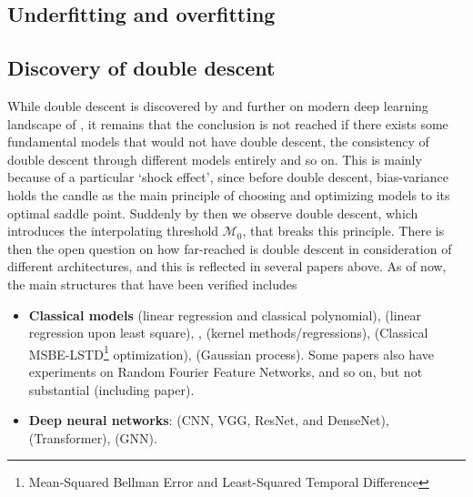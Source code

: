 \subsection{Underfitting and overfitting}



\subsection{Discovery of double descent}
While double descent is discovered by \cite{belkin_reconciling_2019} and further on modern deep learning landscape of \cite{nakkiran_deep_2019}, it remains that the conclusion is not reached if there exists some fundamental models that would not have double descent, the consistency of double descent through different models entirely and so on. This is mainly because of a particular `shock effect', since before double descent, bias-variance holds the candle as the main principle of choosing and optimizing models to its optimal saddle point. Suddenly by then we observe double descent, which introduces the interpolating threshold $\mathcal{M}_{0}$, that breaks this principle. There is then the open question on how far-reached is double descent in consideration of different architectures, and this is reflected in several papers above. As of now, the main structures that have been verified includes
\begin{itemize}[topsep=1pt, itemsep=1pt]
    \item \textbf{Classical models} \cite{Yang_2024,nakkiran2019moredata,schaeffer_double_2023,lafon_understanding_2024} (linear regression and classical polynomial), \cite{NEURIPS2024_2d43f7a6} (linear regression upon least square), \cite{liu2021kernelregressionhighdimensions}, \cite{zhang2024manipulatingsparsedoubledescent,allerbo2025changingkerneltrainingleads} (kernel methods/regressions), \cite{brellmann2024on} (Classical MSBE-LSTD\footnote{Mean-Squared Bellman Error and Least-Squared Temporal Difference} optimization), \cite{harzli2023doubledescentcurvesneuralnetworks} (Gaussian process). Some papers also have experiments on Random Fourier Feature Networks, and so on, but not substantial (including \cite{belkin_reconciling_2019} paper). 
    \item \textbf{Deep neural networks}: \cite{luo2023doubledescentdiscrepancytask,Yang_2024,pezeshki2021multiscalefeaturelearningdynamics} (CNN, VGG, ResNet, and DenseNet), \cite{nakkiran_deep_2019} (Transformer), \cite{shi2024homophilymodulatesdoubledescent} (GNN). 
\end{itemize}

